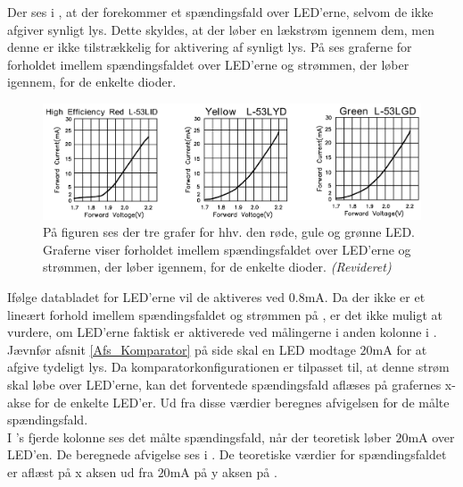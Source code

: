 \noindent Der ses i , at der forekommer et spændingsfald over LED'erne, selvom de ikke afgiver synligt lys. Dette skyldes, at der løber en lækstrøm igennem dem, men denne er ikke tilstrækkelig for aktivering af synligt lys. På  ses graferne for forholdet imellem spændingsfaldet over LED'erne og strømmen, der løber igennem, for de enkelte dioder. \cite{kingbright}
\begin{figure}[H]
	\centering
	\includegraphics[scale=.45]{figures/cProblemloesning/Samlet_system_LED.PNG}
	\caption{På figuren ses der tre grafer for hhv. den røde, gule og grønne LED. Graferne viser forholdet imellem spændingsfaldet over LED'erne og strømmen, der løber igennem, for de enkelte dioder. \textit{(Revideret)} \cite{kingbright}}
	\label{fig:samlet_system_LED}
\end{figure}
\noindent Ifølge databladet for LED'erne vil de aktiveres ved $0.8$mA. Da der ikke er et lineært forhold imellem spændingsfaldet og strømmen på , er det ikke muligt at vurdere, om LED'erne faktisk er aktiverede ved målingerne i anden kolonne i . Jævnfør afsnit \ref{Afs_Komparator} på side \pageref{Afs_Komparator} skal en LED modtage $20$mA for at afgive tydeligt lys. Da komparatorkonfigurationen er tilpasset til, at denne strøm skal løbe over LED'erne, kan det forventede spændingsfald aflæses på grafernes x-akse for de enkelte LED'er. Ud fra disse værdier beregnes afvigelsen for de målte spændingsfald. \\
I 's fjerde kolonne ses det målte spændingsfald, når der teoretisk løber $20$mA over LED'en. De beregnede afvigelse ses i . De teoretiske værdier for spændingsfaldet er aflæst på x aksen ud fra $20$mA på y aksen på .
